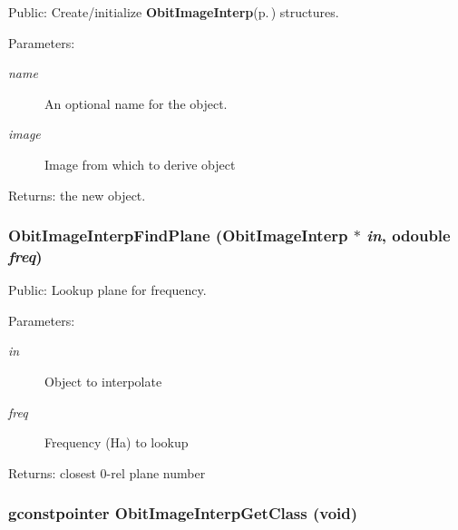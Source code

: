 Public: Create/initialize {\bf Obit\-Image\-Interp}{\rm (p.\,\pageref{structObitImageInterp})} structures. 

\begin{Desc}
\item[Parameters:]
\begin{description}
\item[{\em name}]An optional name for the object. \item[{\em image}]Image from which to derive object \end{description}
\end{Desc}
\begin{Desc}
\item[Returns:]the new object. \end{Desc}
\subsubsection{ Obit\-Image\-Interp\-Find\-Plane ({\bf Obit\-Image\-Interp} $\ast$ {\em in}, {\bf odouble} {\em freq})}\label{ObitImageInterp_8c_a14}


Public: Lookup plane for frequency. 

\begin{Desc}
\item[Parameters:]
\begin{description}
\item[{\em in}]Object to interpolate \item[{\em freq}]Frequency (Ha) to lookup \end{description}
\end{Desc}
\begin{Desc}
\item[Returns:]closest 0-rel plane number \end{Desc}
\subsubsection{\setlength{\rightskip}{0pt plus 5cm}gconstpointer Obit\-Image\-Interp\-Get\-Class (void)}\label{ObitImageInterp_8c_a8}


